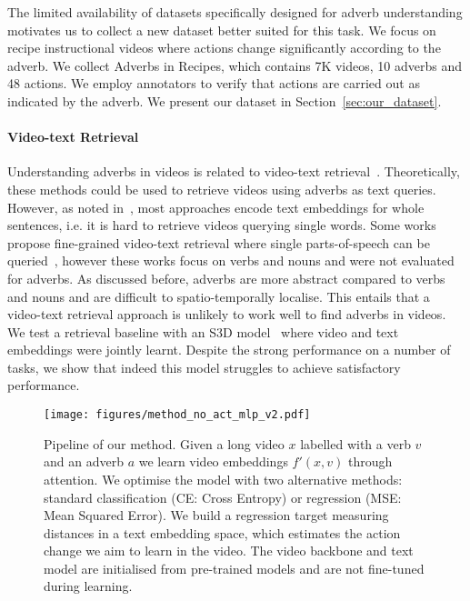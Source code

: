 \documentclass[10pt,twocolumn,letterpaper]{article}
\newcommand{\fparagraph}[1]{\paragraph{#1}}
\begin{document}
The limited availability of datasets specifically designed for adverb understanding motivates us to collect a new dataset better suited for this task. We focus on recipe instructional videos where actions change significantly according to the adverb. We collect Adverbs in Recipes, which contains 7K videos, 10 adverbs and 48 actions. We employ annotators to verify that actions are carried out as indicated by the adverb. We present our dataset in Section~\ref{sec:our_dataset}.

\vspace{-12pt}
\fparagraph{Video-text Retrieval} Understanding adverbs in videos is related to video-text retrieval~\cite{anne2017localizing,krishna2017dense,gao2017tall,mithun2018learning,liu2019use,wang2019language,dong2019dual,miech19endtoend,mun2020local,zeng2020dense,yang2021taco}. 
Theoretically, these methods could be used to retrieve videos using adverbs 
as text queries.
However, as noted in~\cite{doughty2022you}, most approaches encode text embeddings for whole sentences, 
i.e. it is hard to retrieve videos querying single words. Some works propose fine-grained video-text retrieval where single parts-of-speech can be queried~\cite{xu2015jointly,yu2017end,wray2019fine,chen2020fine}, however these works focus on verbs and nouns and were not evaluated for adverbs. As discussed before, adverbs are more abstract 
compared to verbs and nouns and are difficult to spatio-temporally localise. 
This entails that 
a video-text retrieval approach is unlikely to work well to find adverbs in videos. 
We test a retrieval baseline with an S3D model~\cite{miech19endtoend} where video and text embeddings were jointly learnt. Despite the strong performance 
on a number of tasks, we show that indeed this model struggles to achieve satisfactory performance. 

\begin{figure*}[t]
    \centering
    \texttt{[image: figures/method\_no\_act\_mlp\_v2.pdf]}
    \caption{Pipeline of our method. Given a long video $x$ labelled with a verb $v$ and an adverb $a$ we learn video embeddings $f'(x, v)$ through attention. We optimise the model with two alternative methods: standard classification (CE: Cross Entropy) or regression (MSE: Mean Squared Error). We build a regression target measuring distances in a text embedding space, which estimates the action change we aim to learn in the video. The video backbone and text model are initialised from pre-trained models and are not fine-tuned during learning.}
    \label{fig:method}
    \vspace{-10pt}
\end{figure*}
\end{document}
